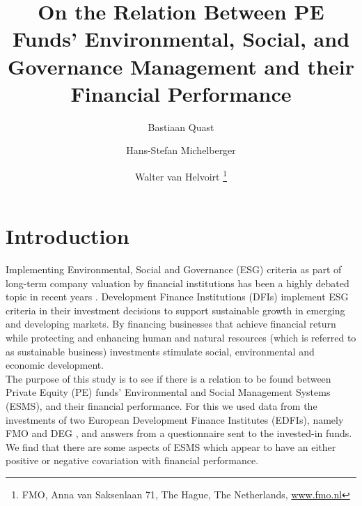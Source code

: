 \documentclass[twoside,12pt]{article}
\title{On the Relation Between PE Funds' Environmental, Social, and Governance Management and their Financial Performance}
\author{Bastiaan Quast \and Hans-Stefan Michelberger \and Walter van Helvoirt \thanks{FMO, Anna van Saksenlaan 71, The Hague, The Netherlands, \url{www.fmo.nl}}}
\let\oldmarginpar\marginpar
\renewcommand\marginpar[1]{\-\oldmarginpar[\raggedleft\footnotesize #1]
{\raggedright\footnotesize #1}}
\begin{document}
\maketitle
{}
\pagebreak	

\tableofcontents
\listoftables

\printnomenclature[1.8cm]

\newpage
\section{Introduction}
Implementing Environmental, Social and Governance (ESG) criteria as part of long-term company valuation by financial institutions has been a highly debated topic in recent years \parencite{gs}. Development Finance Institutions (DFIs) implement ESG criteria in their investment decisions to support sustainable growth in emerging and developing markets. By financing businesses that achieve financial return while protecting and enhancing human and natural resources (which is referred to as sustainable business) investments stimulate social, environmental and economic development.\\

\marginpar{purpose} The purpose of this study is to see if there is a relation to be found between Private Equity (PE) funds' Environmental and Social Management Systems (ESMS), and their financial performance. For this we used data from the investments of two European Development Finance Institutes (EDFIs), namely FMO  and DEG , and answers from a questionnaire sent to the invested-in funds. We find that there are some aspects of ESMS which appear to have an either positive or negative covariation with financial performance.\\
\end{document}
